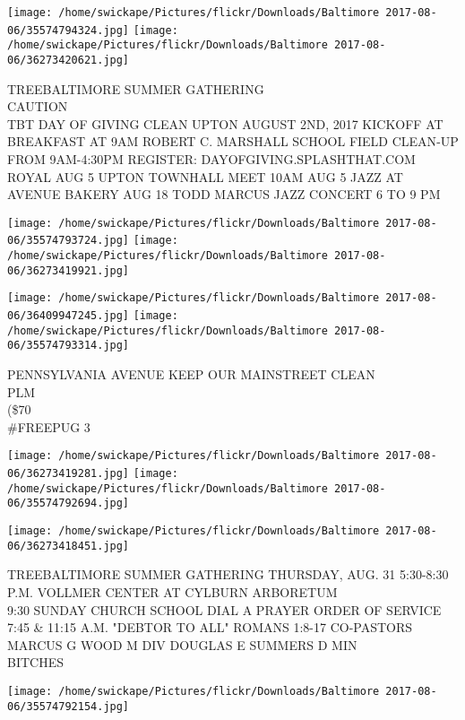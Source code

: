 \documentclass[10pt,letterpaper]{article}
\begin{document}
\texttt{[image: /home/swickape/Pictures/flickr/Downloads/Baltimore 2017-08-06/35574794324.jpg]}
\texttt{[image: /home/swickape/Pictures/flickr/Downloads/Baltimore 2017-08-06/36273420621.jpg]}

TREEBALTIMORE SUMMER GATHERING\\
CAUTION\\
TBT DAY OF GIVING CLEAN UPTON AUGUST 2ND, 2017 KICKOFF AT BREAKFAST AT 9AM ROBERT C. MARSHALL SCHOOL FIELD CLEAN{-}UP FROM 9AM{-}4:30PM REGISTER: DAYOFGIVING.SPLASHTHAT.COM\\
ROYAL AUG 5 UPTON TOWNHALL MEET 10AM AUG 5 JAZZ AT AVENUE BAKERY AUG 18 TODD MARCUS JAZZ CONCERT 6 TO 9 PM\\
\pagebreak

\texttt{[image: /home/swickape/Pictures/flickr/Downloads/Baltimore 2017-08-06/35574793724.jpg]}
\texttt{[image: /home/swickape/Pictures/flickr/Downloads/Baltimore 2017-08-06/36273419921.jpg]}

\texttt{[image: /home/swickape/Pictures/flickr/Downloads/Baltimore 2017-08-06/36409947245.jpg]}
\texttt{[image: /home/swickape/Pictures/flickr/Downloads/Baltimore 2017-08-06/35574793314.jpg]}

PENNSYLVANIA AVENUE KEEP OUR MAINSTREET CLEAN\\
PLM\\
(\$70\\
\#FREEPUG 3\\
\pagebreak

\texttt{[image: /home/swickape/Pictures/flickr/Downloads/Baltimore 2017-08-06/36273419281.jpg]}
\texttt{[image: /home/swickape/Pictures/flickr/Downloads/Baltimore 2017-08-06/35574792694.jpg]}

\texttt{[image: /home/swickape/Pictures/flickr/Downloads/Baltimore 2017-08-06/36273418451.jpg]}

TREEBALTIMORE SUMMER GATHERING THURSDAY, AUG. 31 5:30{-}8:30 P.M. VOLLMER CENTER AT CYLBURN ARBORETUM\\
9:30 SUNDAY CHURCH SCHOOL DIAL A PRAYER ORDER OF SERVICE 7:45 \& 11:15 A.M. "DEBTOR TO ALL" ROMANS 1:8{-}17 CO{-}PASTORS MARCUS G WOOD M DIV DOUGLAS E SUMMERS D MIN\\
BITCHES\\
\pagebreak

\texttt{[image: /home/swickape/Pictures/flickr/Downloads/Baltimore 2017-08-06/35574792154.jpg]}
\end{document}
